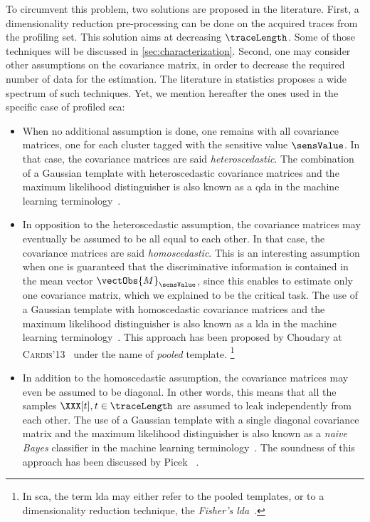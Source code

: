 To circumvent this problem, two solutions are proposed in the literature.
First, a dimensionality reduction pre-processing can be done on the acquired traces from the profiling set.
This solution aims at decreasing \(\traceLength\).
Some of those techniques will be discussed in \autoref{sec:characterization}.
Second, one may consider other assumptions on the covariance matrix, in order to decrease the required number of data for the estimation.
The literature in statistics proposes a wide spectrum of such techniques.
Yet, we mention hereafter the ones used in the specific case of profiled \gls{sca}:
\begin{itemize}
    \item When no additional assumption is done, one remains with all covariance matrices, one for each cluster tagged with the sensitive value \(\sensValue\).
    In that case, the covariance matrices are said \emph{heteroscedastic}.
    The combination of a Gaussian template with heteroscedastic covariance matrices and the maximum likelihood distinguisher is also known as a \gls{qda} in the machine learning terminology~\cite[Chap.~4.3]{hastie_elements_1993}.
    \item In opposition to the heteroscedastic assumption, the covariance matrices may eventually be assumed to be all equal to each other.
    In that case, the covariance matrices are said \emph{homoscedastic}.
    This is an interesting assumption when one is guaranteed that the discriminative information is contained in the mean vector \(\vectObs{M}_\sensValue\), since this enables to estimate only one covariance matrix, which we explained to be the critical task.
    The use of a Gaussian template with homoscedastic covariance matrices and the maximum likelihood distinguisher is also known as a \gls{lda} in the machine learning terminology~\cite[Chap.~4.3]{hastie_elements_1993}.
    This approach has been proposed by Choudary \etal{} at \textsc{Cardis}'13~\cite{choudary_efficient_2014} under the name of \emph{pooled} template.%
    \footnote{
        In \gls{sca}, the term \gls{lda} may either refer to the pooled templates, or to a dimensionality reduction technique, \aka{} the \emph{Fisher's \gls{lda}}~\cite{standaert_using_2008}.
    }
    \item In addition to the homoscedastic assumption, the covariance matrices may even be assumed to be diagonal.
    In other words, this means that all the samples \(\XXX[t], t \in \traceLength\)  are assumed to leak independently from each other.
    The use of a Gaussian template with a single diagonal covariance matrix and the maximum likelihood distinguisher is also known as a \emph{naive Bayes} classifier in the machine learning terminology~\cite[Chap.~6.6.3]{hastie_elements_1993}.
    The soundness of this approach has been discussed by Picek \etal{}~\cite{picek_template_2017}.
\end{itemize}

